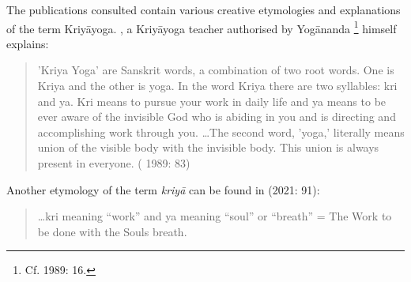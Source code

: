 The publications consulted contain various creative etymologies and explanations of the term Kriyāyoga. \citeauthor{hariharananda1989}, a Kriyāyoga teacher authorised by Yogānanda \footnote{Cf. \citeauthor{hariharananda1989} 1989: 16.} himself explains: \begin{quote} 'Kriya Yoga' are Sanskrit words, a combination of two root words. One is Kriya and the other is yoga. In the word Kriya there are two syllables: kri and ya. Kri means to pursue your work in daily life and ya means to be ever aware of the invisible God who is abiding in you and is directing and accomplishing work through you. \ldots  The second word, 'yoga,' literally means union of the visible body with the invisible body. This union is always present in everyone. (\citeauthor{hariharananda1989} 1989: 83) \end{quote}
Another etymology of the term \textit{kriyā} can be found in \citeauthor{kriyayogalowenstein} (2021: 91): \begin{quote} \ldots kri meaning ``work'' and ya meaning ``soul'' or ``breath'' = The Work to be done with the Souls breath. \end{quote}

